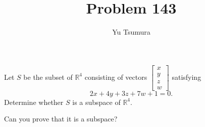 \documentclass{ximera}
\title{Problem 143}
\author{Yu Tsumura}
\begin{document}
\begin{problem}
  Let $S$ be the subset of $\mathbb{R}^4$ consisting of vectors $\begin{bmatrix}
    x \\
    y \\
    z \\
    w 
  \end{bmatrix}$ satisfying
  \[2x+4y+3z+7w+1=0.\]
  Determine whether $S$ is a subspace of $\mathbb{R}^4$.

  \begin{multipleChoice}
  \end{multipleChoice}

  \begin{feedback}[correct]
    Can you prove that it is a subspace?
  \end{feedback}
\end{problem}
\end{document}
